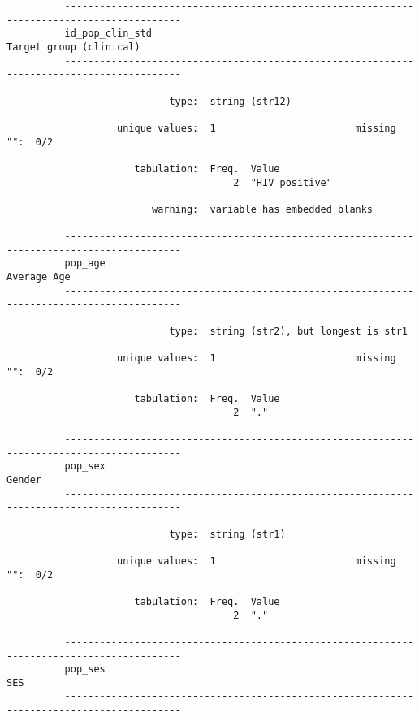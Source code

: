 \documentclass{article}
\begin{document}
\begin{verbatim}
          ------------------------------------------------------------------------------------------
          id_pop_clin_std                                                    Target group (clinical)
          ------------------------------------------------------------------------------------------
          
                            type:  string (str12)
          
                   unique values:  1                        missing "":  0/2
          
                      tabulation:  Freq.  Value
                                       2  "HIV positive"
          
                         warning:  variable has embedded blanks
          
          ------------------------------------------------------------------------------------------
          pop_age                                                                        Average Age
          ------------------------------------------------------------------------------------------
          
                            type:  string (str2), but longest is str1
          
                   unique values:  1                        missing "":  0/2
          
                      tabulation:  Freq.  Value
                                       2  "."
          
          ------------------------------------------------------------------------------------------
          pop_sex                                                                             Gender
          ------------------------------------------------------------------------------------------
          
                            type:  string (str1)
          
                   unique values:  1                        missing "":  0/2
          
                      tabulation:  Freq.  Value
                                       2  "."
          
          ------------------------------------------------------------------------------------------
          pop_ses                                                                                SES
          ------------------------------------------------------------------------------------------
          

\end{verbatim}
\end{document}

